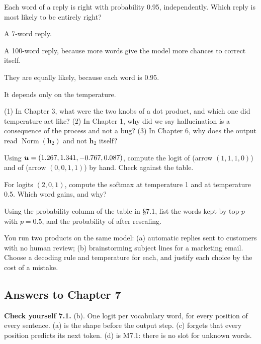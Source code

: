 \begin{checkq}
Each word of a reply is right with probability 0.95, independently. Which reply is most likely to be entirely right?
\begin{options}
\item A 7-word reply.
\item A 100-word reply, because more words give the model more chances to correct itself.
\item They are equally likely, because each word is 0.95.
\item It depends only on the temperature.
\end{options}
\end{checkq}


\begin{lookingback}
(1) In Chapter 3, what were the two knobs of a dot product, and which one did temperature act like? (2) In Chapter 1,
why did we say hallucination is a consequence of the process and not a bug? (3) In Chapter 6, why does the output read
$\operatorname{Norm}(\bm{h}_2)$ and not $\bm{h}_2$ itself?
\end{lookingback}

\begin{exercise}
Using $\bm{u}=(1.267, 1.341, -0.767, 0.087)$, compute the logit of  (arrow $(1,1,1,0)$) and of  (arrow $(0,0,1,1)$)
by hand. Check against the table.
\end{exercise}
\begin{exercise}
For logits $(2, 0, 1)$, compute the softmax at temperature 1 and at temperature 0.5. Which word gains, and why?
\end{exercise}
\begin{exercise}
Using the probability column of the table in \S7.1, list the words kept by top-$p$ with $p=0.5$, and the
probability of  after rescaling.
\end{exercise}
\begin{exercise}
You run two products on the same model: (a) automatic replies sent to customers with no human review; (b)
brainstorming subject lines for a marketing email. Choose a decoding rule and temperature for each, and justify each
choice by the cost of a mistake.
\end{exercise}

\subsection*{Answers to Chapter 7}
\small
\textbf{Check yourself 7.1.} (b). One logit per vocabulary word, for every position of every sentence. (a) is the
shape before the output step. (c) forgets that every position predicts its next token. (d) is M7.1: there is no slot
for unknown words.

